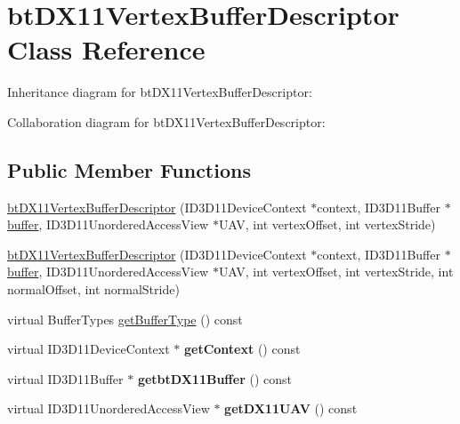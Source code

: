 \hypertarget{classbt_d_x11_vertex_buffer_descriptor}{\section{bt\+D\+X11\+Vertex\+Buffer\+Descriptor Class Reference}
\label{classbt_d_x11_vertex_buffer_descriptor}
}


Inheritance diagram for bt\+D\+X11\+Vertex\+Buffer\+Descriptor\+:


Collaboration diagram for bt\+D\+X11\+Vertex\+Buffer\+Descriptor\+:
\subsection*{Public Member Functions}
\begin{DoxyCompactItemize}
\item 
\hyperlink{classbt_d_x11_vertex_buffer_descriptor_af395186594c4954fb48971cd7e1eb2b8}{bt\+D\+X11\+Vertex\+Buffer\+Descriptor} (I\+D3\+D11\+Device\+Context $\ast$context, I\+D3\+D11\+Buffer $\ast$\hyperlink{structbuffer}{buffer}, I\+D3\+D11\+Unordered\+Access\+View $\ast$U\+A\+V, int vertex\+Offset, int vertex\+Stride)
\item 
\hyperlink{classbt_d_x11_vertex_buffer_descriptor_a85ff10c8bcf97f7109496411d2eded6e}{bt\+D\+X11\+Vertex\+Buffer\+Descriptor} (I\+D3\+D11\+Device\+Context $\ast$context, I\+D3\+D11\+Buffer $\ast$\hyperlink{structbuffer}{buffer}, I\+D3\+D11\+Unordered\+Access\+View $\ast$U\+A\+V, int vertex\+Offset, int vertex\+Stride, int normal\+Offset, int normal\+Stride)
\item 
virtual Buffer\+Types \hyperlink{classbt_d_x11_vertex_buffer_descriptor_a99ca2a25cf87fb81021727e728d4a1f1}{get\+Buffer\+Type} () const 
\item 
\hypertarget{classbt_d_x11_vertex_buffer_descriptor_a9a86cf612a071dac1727e0f0ff792e6d}{virtual I\+D3\+D11\+Device\+Context $\ast$ {\bfseries get\+Context} () const }\label{classbt_d_x11_vertex_buffer_descriptor_a9a86cf612a071dac1727e0f0ff792e6d}

\item 
\hypertarget{classbt_d_x11_vertex_buffer_descriptor_a717b0932c11875062a626f0b49bcab94}{virtual I\+D3\+D11\+Buffer $\ast$ {\bfseries getbt\+D\+X11\+Buffer} () const }\label{classbt_d_x11_vertex_buffer_descriptor_a717b0932c11875062a626f0b49bcab94}

\item 
\hypertarget{classbt_d_x11_vertex_buffer_descriptor_a345b29c63cf1f04dd8b7e54a9c3ccf7a}{virtual I\+D3\+D11\+Unordered\+Access\+View $\ast$ {\bfseries get\+D\+X11\+U\+A\+V} () const }\label{classbt_d_x11_vertex_buffer_descriptor_a345b29c63cf1f04dd8b7e54a9c3ccf7a}

\end{DoxyCompactItemize}
